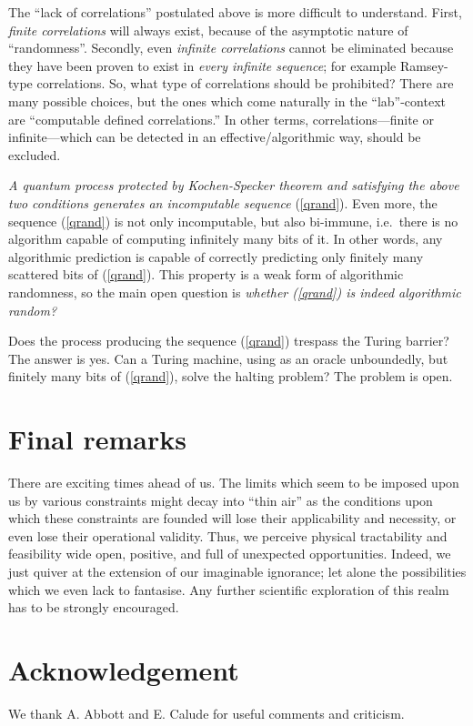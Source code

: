 \documentclass[11pt, pra,amsfonts,showpacs,showkeys]{revtex4}%
\begin{document}
The ``lack of correlations''  postulated above is more difficult to understand. First, {\it finite correlations} will always exist, because of the asymptotic nature of ``randomness''.
Secondly, even {\it infinite correlations} cannot be eliminated because they have been proven to exist in
{\it every infinite sequence};  for example Ramsey-type correlations. So, what type of correlations should be prohibited?
There are many possible choices, but the ones which come naturally in the ``lab''-context are ``computable defined correlations.'' In other terms, correlations---finite or infinite---which can be detected in an effective/algorithmic way, should be excluded.


{\em A quantum process protected by Kochen-Specker theorem and satisfying the above two conditions
generates an incomputable sequence} (\ref{qrand}). Even more, the sequence
(\ref{qrand}) is not only incomputable, but also bi-immune, i.e.\ there is no algorithm capable of computing
infinitely many bits of it.
In other words, any algorithmic prediction is capable of
correctly predicting only finitely many scattered bits of (\ref{qrand}).
This property is a weak form of algorithmic randomness,
 so the main open question is {\em whether (\ref{qrand}) is indeed algorithmic random?}


Does the process producing the sequence (\ref{qrand}) trespass the Turing barrier? The answer is yes.
Can a Turing machine, using  as an oracle unboundedly, but finitely many bits of (\ref{qrand}), solve the halting problem? The problem is open. %


\section*{Final remarks}

There are exciting times ahead of us.
The limits which seem to be imposed upon us by various constraints
might decay into ``thin air'' as the conditions upon which these constraints are founded will lose their applicability and necessity, or even lose their operational validity.
Thus, we perceive physical tractability and feasibility wide open, positive, and full of unexpected opportunities.
Indeed, we just quiver at the extension of our imaginable ignorance; let alone the possibilities which we even lack to fantasise.
Any further scientific exploration of this realm has to be strongly encouraged.

\section*{Acknowledgement}
We thank A. Abbott and E. Calude for useful comments and criticism.
\end{document}
